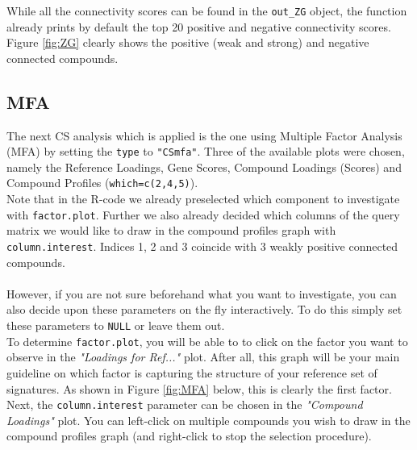 \documentclass[a4paper]{article}\usepackage[]{graphicx}\usepackage[]{color}
\begin{document}
\noindent While all the connectivity scores can be found in the \texttt{out\_ZG}
object, the function already prints by default the top 20 positive and negative
connectivity scores. Figure \ref{fig:ZG} clearly shows the positive (weak and
strong) and negative connected compounds.

\subsection{MFA}
The next CS analysis which is applied is the one using Multiple Factor Analysis
(MFA) by setting the \texttt{type} to \texttt{"CSmfa"}. Three of the
available plots were chosen, namely the Reference Loadings, Gene Scores,
Compound Loadings (Scores) and Compound Profiles (\texttt{which=c(2,4,5)}).\\
Note that in the R-code we already preselected which component to investigate
with \texttt{factor.plot}.
Further we also already decided which columns of the query matrix we would like
to draw in the compound profiles graph with \texttt{column.interest}. Indices 1, 2 and 3 coincide
with 3 weakly positive connected compounds.\\ \\
However, if you are not sure beforehand what you want to investigate, you can
also decide upon these parameters on the fly interactively. To do this simply
set these parameters to \texttt{NULL} or leave them out.\\
To determine \texttt{factor.plot}, you will be able to to click on the factor
you want to observe in the {\it "Loadings for Ref..."} plot. After all, this graph will be
your main guideline on which factor is capturing the structure of your reference
set of signatures. As shown in Figure \ref{fig:MFA} below, this is clearly the
first factor. \\
Next, the \texttt{column.interest} parameter can be chosen in the {\it "Compound
Loadings"} plot. You can left-click on multiple compounds you wish to draw in
the compound profiles graph (and right-click to stop the selection procedure). 
\end{document}
